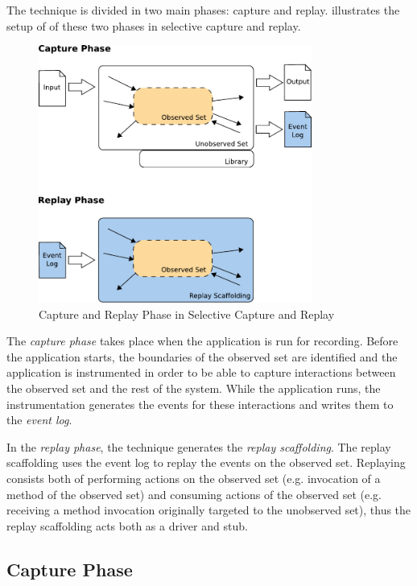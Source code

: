 The technique is divided in two main phases: capture and replay.  illustrates the setup of of these two phases in selective capture and replay.
\begin{figure}[ht]
  \centering
  \includegraphics[width=0.8\textwidth]{illustrations/scr_capture_replay_phase}
  \caption{Capture and Replay Phase in Selective Capture and Replay}
  \label{fig:scr_capture_replay_phase}
\end{figure}
The \emph {capture phase} takes place when the application is run for recording. Before the application starts, the boundaries of the observed set are identified and the application is instrumented in order to be able to capture interactions between the observed set and the rest of the system. While the application runs, the instrumentation generates the events for these interactions and writes them to the \emph{event log}.

In the \emph{replay phase}, the technique generates the \emph{replay scaffolding}. The replay scaffolding uses the event log to replay the events on the observed set. Replaying consists both of performing actions on the observed set (e.g. invocation of a method of the observed set) and consuming actions of the observed set (e.g. receiving a method invocation originally targeted to the unobserved set), thus the replay scaffolding acts both as a driver and stub.

\subsection{Capture Phase}
